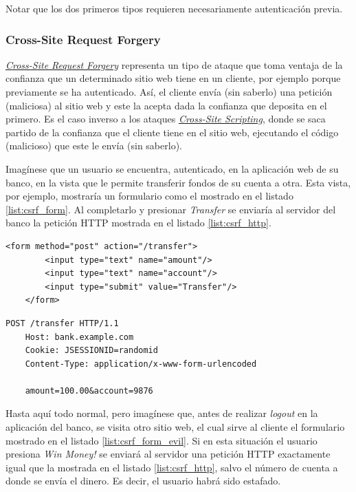 \documentclass[a4paper]{article}
\begin{document}
	Notar que los dos primeros tipos requieren necesariamente autenticación previa.
	
	\subsubsection{Cross-Site Request Forgery}
	\href{https://en.wikipedia.org/wiki/Cross-site_request_forgery}{\emph{Cross-Site Request Forgery}} representa un tipo de ataque que toma ventaja de la confianza que un determinado sitio web tiene en un cliente, por ejemplo porque previamente se ha autenticado. Así, el cliente envía (sin saberlo) una petición (maliciosa) al sitio web y este la acepta dada la confianza que deposita en el primero. Es el caso inverso a los ataques \href{https://owasp.org/www-community/attacks/xss/}{\emph{Cross-Site Scripting}}, donde se saca partido de la confianza que el cliente tiene en el sitio web, ejecutando el código (malicioso) que este le envía (sin saberlo).
	
	Imagínese que un usuario se encuentra, autenticado, en la aplicación web de su banco, en la vista que le permite transferir fondos de su cuenta a otra. Esta vista, por ejemplo, mostraría un formulario como el mostrado en el listado \ref{list:csrf_form}. Al completarlo y presionar \emph{Transfer} se enviaría al servidor del banco la petición HTTP mostrada en el listado \ref{list:csrf_http}.
	\\
	
	\begin{lstlisting}[caption=Formulario inseguro para la transferencia de fondos,label=list:csrf_form]
	<form method="post" action="/transfer">
		<input type="text" name="amount"/>
		<input type="text" name="account"/>
		<input type="submit" value="Transfer"/>
	</form>
	\end{lstlisting}
	
	\begin{lstlisting}[caption=Petición HTTP insegura para la transferencia de fondos,label=list:csrf_http]
	POST /transfer HTTP/1.1
	Host: bank.example.com
	Cookie: JSESSIONID=randomid
	Content-Type: application/x-www-form-urlencoded
	
	amount=100.00&account=9876
	\end{lstlisting}
	
	Hasta aquí todo normal, pero imagínese que, antes de realizar \emph{logout} en la aplicación del banco, se visita otro sitio web, el cual sirve al cliente el formulario mostrado en el listado \ref{list:csrf_form_evil}. Si en esta situación el usuario presiona \emph{Win Money!} se enviará al servidor una petición HTTP exactamente igual que la mostrada en el listado \ref{list:csrf_http}, salvo el número de cuenta a donde se envía el dinero. Es decir, el usuario habrá sido estafado.
	\\
	
\end{document}
